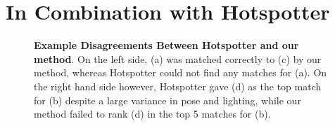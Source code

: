 



\section{In Combination with Hotspotter}

\begin{figure}[t]%
\centering
{}
\newline
{}
\caption{\textbf{Example Disagreements Between Hotspotter and our method}. On the left side, (a) was matched correctly to (c) by our method, whereas Hotspotter could not find any matches for (a). On the right hand side however, Hotspotter gave (d) as the top match for (b) despite a large variance in pose and lighting, while our method failed to rank (d) in the top 5 matches for (b).}
\label{fig:dis_proot}
\end{figure}

